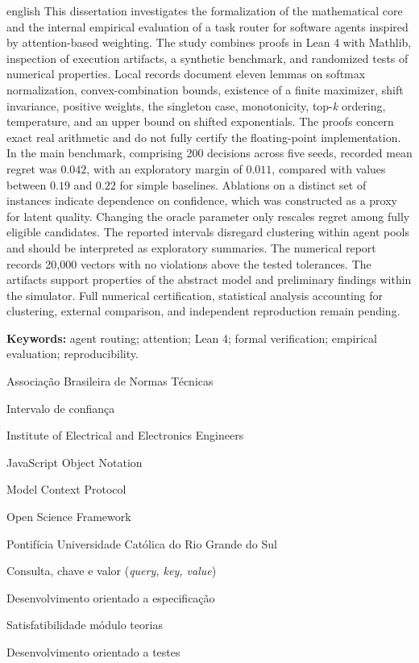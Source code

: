 \documentclass[12pt,openany,oneside,a4paper,brazil,chapter=TITLE]{abntex2}
\begin{document}
\begin{resumo}[Abstract]
\begin{otherlanguage*}{english}
This dissertation investigates the formalization of the mathematical core and the internal empirical evaluation of a task router for software agents inspired by attention-based weighting. The study combines proofs in Lean 4 with Mathlib, inspection of execution artifacts, a synthetic benchmark, and randomized tests of numerical properties. Local records document eleven lemmas on softmax normalization, convex-combination bounds, existence of a finite maximizer, shift invariance, positive weights, the singleton case, monotonicity, top-\textit{k} ordering, temperature, and an upper bound on shifted exponentials. The proofs concern exact real arithmetic and do not fully certify the floating-point implementation. In the main benchmark, comprising 200 decisions across five seeds, recorded mean regret was $0.042$, with an exploratory margin of $0.011$, compared with values between $0.19$ and $0.22$ for simple baselines. Ablations on a distinct set of instances indicate dependence on confidence, which was constructed as a proxy for latent quality. Changing the oracle parameter only rescales regret among fully eligible candidates. The reported intervals disregard clustering within agent pools and should be interpreted as exploratory summaries. The numerical report records 20,000 vectors with no violations above the tested tolerances. The artifacts support properties of the abstract model and preliminary findings within the simulator. Full numerical certification, statistical analysis accounting for clustering, external comparison, and independent reproduction remain pending.
\par\vspace{\baselineskip}
\noindent\textbf{Keywords:} agent routing; attention; Lean 4; formal verification; empirical evaluation; reproducibility.
\end{otherlanguage*}
\end{resumo}
\listoftables*
\begin{siglas}
\item[ABNT] Associação Brasileira de Normas Técnicas
\item[IC] Intervalo de confiança
\item[IEEE] Institute of Electrical and Electronics Engineers
\item[JSON] JavaScript Object Notation
\item[MCP] Model Context Protocol
\item[OSF] Open Science Framework
\item[PUCRS] Pontifícia Universidade Católica do Rio Grande do Sul
\item[Q/K/V] Consulta, chave e valor (\textit{query, key, value})
\item[SDD] Desenvolvimento orientado a especificação
\item[SMT] Satisfatibilidade módulo teorias
\item[TDD] Desenvolvimento orientado a testes
\end{siglas}
\end{document}
